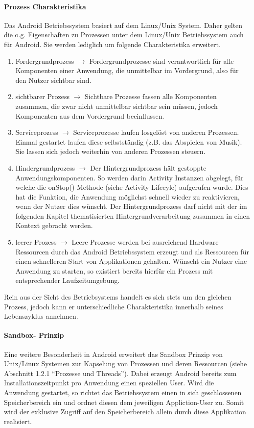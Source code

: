 \documentclass[12pt,oneside,a4paper,bibtotoc,liststotoc]{scrreprt}
\begin{document}
\paragraph{Prozess Charakteristika}
Das Android Betriebssystem basiert auf dem Linux/Unix System. Daher gelten die o.g. Eigenschaften zu Prozessen unter dem Linux/Unix Betriebssystem auch für Android. Sie werden lediglich um folgende Charakteristika erweitert.
\begin{enumerate}
\item Fordergrundprozess $\rightarrow$ Fordergrundprozesse sind verantwortlich für alle Komponenten einer Anwendung, die unmittelbar im Vordergrund, also für den Nutzer sichtbar sind.
\item sichtbarer Prozess $\rightarrow$ Sichtbare Prozesse fassen alle Komponenten zusammen, die zwar nicht unmittelbar sichtbar sein müssen, jedoch Komponenten aus dem Vordergrund beeinflussen.
\item Serviceprozess $\rightarrow$  Serviceprozesse laufen losgelöst von anderen Prozessen. Einmal gestartet laufen diese selbstständig (z.B. das Abspielen von Musik). Sie lassen sich jedoch weiterhin von anderen Prozessen steuern.
\item Hindergrundprozess $\rightarrow$ Der Hintergrundprozess hält gestoppte Anwendungskomponenten. So werden darin Activity Instanzen abgelegt, für welche die onStop() Methode (siehe Activity Lifecyle) aufgerufen wurde. Dies hat die Funktion, die Anwendung möglichst schnell wieder zu reaktivieren, wenn der Nutzer dies wünscht. Der Hintergrundprozess darf nicht mit der im folgenden Kapitel thematisierten Hintergrundverarbeitung zusammen in einen Kontext gebracht werden.
\item leerer Prozess $\rightarrow$ Leere Prozesse werden bei ausreichend Hardware Ressourcen durch das Android Betriebssystem erzeugt und als Ressourcen für einen schnelleren Start von Applikationen gehalten. Wünscht ein Nutzer eine Anwendung zu starten, so existiert bereits hierfür ein Prozess mit entsprechender Laufzeitumgebung.
\end{enumerate}
Rein aus der Sicht des Betriebsystems handelt es sich stets um den gleichen Prozess, jedoch kann er unterschiedliche Charakteristika innerhalb seines Lebenszyklus annehmen.
\paragraph{Sandbox- Prinzip}
Eine weitere Besonderheit in Android erweitert das Sandbox Prinzip von Unix/Linux Systemen zur Kapselung von Prozessen und deren Ressourcen (siehe Abschnitt 1.2.1 “Prozesse und Threads”). Dabei erzeugt Android bereits zum Installationszeitpunkt pro Anwendung einen speziellen User. Wird die Anwendung gestartet, so richtet das Betriebssystem einen in sich geschlossenen Speicherbereich ein und ordnet diesen dem jeweiligen Appliction-User zu. Somit wird der exklusive Zugriff auf den Speicherbereich allein durch diese Applikation realisiert.
\end{document}
